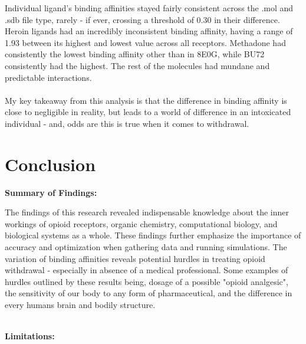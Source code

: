 \documentclass[a4paper,10pt]{article}
\begin{document}
Individual ligand's binding affinities stayed fairly consistent across the .mol and .sdb file type, rarely - if ever, crossing a threshold of 0.30 in their difference. Heroin ligands had an incredibly inconsistent binding affinity, having a range of 1.93 between its highest and lowest value across all receptors. Methadone had consistently the lowest binding affinity other than in 8E0G, while BU72 consistently had the highest. The rest of the molecules had mundane and predictable interactions. \\
\\
My key takeaway from this analysis is that the difference in binding affinity is close to negligible in reality, but leads to a world of difference in an intoxicated individual - and, odds are this is true when it comes to withdrawal. 


\section{Conclusion}
\small
\textbf{Summary of Findings:}

The findings of this research revealed indispensable knowledge about the inner workings of opioid receptors, organic chemistry, computational biology, and biological systems as a whole. These findings further emphasize the importance of accuracy and optimization when gathering data and running simulations. The variation of binding affinities reveals potential hurdles in treating opioid withdrawal - especially in absence of a medical professional. Some examples of hurdles outlined by these results being, dosage of a possible "opioid analgesic", the sensitivity of our body to any form of pharmaceutical, and the difference in every humans brain and bodily structure.\\
\\

\begin{raggedleft}
    \textbf{Limitations:}
    \end{raggedleft}
\end{document}
